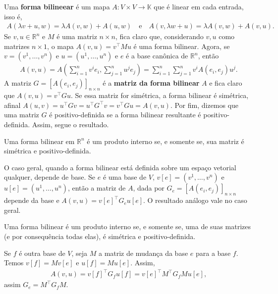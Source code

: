 Uma \textbf{forma bilineear} é um mapa $A \colon V \times V \to \mathbb{K}$ que é linear em cada entrada, isso é, \begin{eqnarray}
    A(\lambda v + u, w) = \lambda A(v,w) + A(u,w) \quad \text{e} \quad A(v, \lambda w + u) = \lambda A(v, w) + A(v, u).
\end{eqnarray} Se $v, u \in \mathbb{R}^n$ e $M$ é uma matriz $n \times n$, fica claro que, considerando $v, u$ como matrizes $n \times 1$, o mapa $A(v,u) = v^\top M u$ é uma forma bilinear. Agora, se $v = (v^1, \dots, v^n)$ e $u = (u^1, \dots, u^n)$ e $e$ é a base canônica de $\mathbb{R}^n$, então \begin{align}
    A(v,u) = A\left(\sum_{i = 1}^n v^i e_i, \sum_{j = 1}^n u^j e_j\right) = \sum_{i = 1}^n \sum_{j = 1}^n v^i A(e_i, e_j) u^j.
\end{align} A matriz $G = [A(e_i, e_j)]_{n \times n}$ é a \textbf{matriz da forma bilinear} $A$ e fica claro que $A(v, u) = v^\top G u$. Se essa matriz for simétrica, a forma bilinear é simétrica, afinal $A(u,v) = u^\top G v = u^\top G^\top v = v^\top G u = A(v,u)$. Por fim, dizemos que uma matriz $G$ é positivo-definida se a forma bilinear resultante é positivo-definida. Assim, segue o resultado.

\begin{proposition}
    Uma forma bilinear em $\mathbb{R}^n$ é um produto interno se, e somente se, sua matriz é simétrica e positivo-definida.
\end{proposition}

O caso geral, quando a forma bilinear está definida sobre um espaço vetorial qualquer, depende de base. Se $e$ é uma base de $V$, $v[e] = (v^1, \dots, v^n)$ e $u[e] = (u^1, \dots, u^n)$, então a matriz de $A$, dada por $G_e = [A(e_i,e_j)]_{n \times n}$ depende da base e $A(v, u) = v[e]^\top G_e u[e]$. O resultado análogo vale no caso geral.

\begin{proposition}
    Uma forma bilinear é um produto interno se, e somente se, uma de suas matrizes (e por consequência todas elas), é simétrica e positivo-definida.
\end{proposition}

Se $f$ é outra base de $V$, seja $M$ a matriz de mudança da base $e$ para a base $f$. Temos $v[f] = Mv[e]$ e $u[f] = Mu[e]$. Assim, \begin{eqnarray}
    A(v,u) = v[f]^\top G_f u[f] = v[e]^\top M^\top G_f M u[e],
\end{eqnarray} assim $G_e = M^\top G_f M$.

